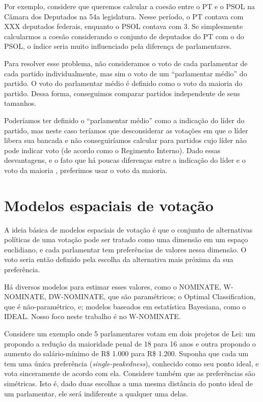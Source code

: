 \documentclass[a4paper,titlepage]{ppgi}\usepackage[]{graphicx}\usepackage[]{color}
\begin{document}
Por exemplo, considere que queremos calcular a coesão entre o \gls{PT} e o \gls{PSOL} na
Câmara dos Deputados na 54a legislatura. Nesse período, o \gls{PT} contava com XXX
deputados federais, enquanto o \gls{PSOL} contava com 3. Se simplesmente calcularmos
a coesão considerando o conjunto de deputados do \gls{PT} com o do \gls{PSOL}, o índice
seria muito influenciado pela diferença de parlamentares.

Para resolver esse problema, não consideramos o voto de cada parlamentar de
cada partido individualmente, mas sim o voto de um ``parlamentar médio'' do
partido. O voto do parlamentar médio é definido como o voto da maioria do
partido. Dessa forma, conseguimos comparar partidos independente de seus
tamanhos.

Poderíamos ter definido o ``parlamentar médio'' como a indicação do líder do
partido, mas neste caso teríamos que desconsiderar as votações em que o líder
libera sua bancada e não conseguiríamos calcular para partidos cujo líder não
pode indicar voto (de acordo como o Regimento Interno). Dado essas
desvantagens, e o fato que há poucas diferenças entre a indicação do líder e o
voto da maioria \cite{Limongi1995}, preferimos usar o voto da maioria.

\section{Modelos espaciais de votação}



A ideia básica de modelos espaciais de votação é que o conjunto de alternativas
políticas de uma votação pode ser tratado como uma dimensão em um espaço
euclidiano, e cada parlamentar tem preferências de valores nessa dimensão. O
voto seria então definido pela escolha da alternativa mais próxima da sua
preferência.

Há diversos modelos para estimar esses valores, como o NOMINATE, W-NOMINATE,
DW-NOMINATE, que são paramétricos; o Optimal Classification, que é
não-paramétrico, e; modelos baseados em estatística Bayesiana, como o IDEAL.
Nosso foco neste trabalho é no W-NOMINATE.
\cite{Poole2000,Poole2005,Poole2014,Jackman2000,Clinton2004}

Considere um exemplo onde 5 parlamentares votam em
dois projetos de Lei: um propondo a redução da maioridade penal de
18 para 16 anos e outra
propondo o aumento do salário-mínimo de R\$ 1.000 para
R\$ 1.200. Suponha que cada um tem uma única preferência
(\emph{single-peakedness}), conhecido como seu ponto ideal, e vota sinceramente
de acordo com ela. Considere também que as preferências são simétricas. Isto é,
dado duas escolhas a uma mesma distância do ponto ideal de um parlamentar, ele
será indiferente a qualquer uma delas.
\end{document}
